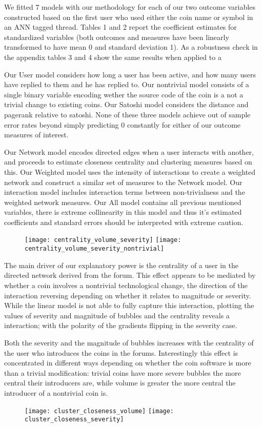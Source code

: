 We fitted $7$ models with our methodology for each of our two outcome variables constructed based on the first user who used either the coin name or symbol in an ANN tagged thread.
Tables 1 and 2 report the coefficient estimates for standardized variables (both outcomes and measures have been linearly transformed to have mean 0 and standard deviation 1).
As a robustness check in the appendix tables 3 and 4 show the same results when applied to a 

Our User model considers how long a user has been active, and how many users have replied to them and he has replied to. 
Our nontrivial model consists of a single binary variable encoding wether the source code of the coin is a not a trivial change to existing coins. 
Our Satoshi model considers the distance and pagerank relative to satoshi.
None  of these three models achieve out of sample error rates beyond simply predicting $0$ constantly for either of our outcome measures of interest.


Our Network model encodes directed edges when a user interacts with another, and proceeds to estimate closeness centrality and clustering measures based on this. 
Our Weighted model uses the intensity of interactions to create a weighted network and construct a similar set of measures to the Network model.
Our interaction model includes interaction terms between non-trivialness and the weighted network measures.
Our All model contains all previous mentioned variables, there is extreme collinearity in this model and thus it's estimated coefficients and standard errors should be interpreted with extreme caution. 


\begin{figure}[h]
\texttt{[image: centrality\_volume\_severity]}
\texttt{[image: centrality\_volume\_severity\_nontrivial]}
\end{figure}

The main driver of our explanatory power is the centrality of a user in the directed network derived from the forum. 
This effect appears to be mediated by whether a coin involves a nontrivial technological change, the direction of the interaction reversing depending on whether it relates to magnitude or severity.
While the linear model is not able to fully capture this interaction, plotting the values of severity and magnitude of bubbles and the centrality reveals a interaction; with the polarity of the gradients flipping in the severity case.

Both the severity and the magnitude of bubbles increases with the centrality of the user who introduces the coins in the forums.  
Interestingly this effect is concentrated in different ways depending on whether the coin software is more than a trivial modification: trivial coins have more severe bubbles the more central their introducers are, while volume is greater the more central the introducer of a nontrivial coin is.






\begin{figure}[h]
\texttt{[image: cluster\_closeness\_volume]}
\texttt{[image: cluster\_closeness\_severity]}
\end{figure}

